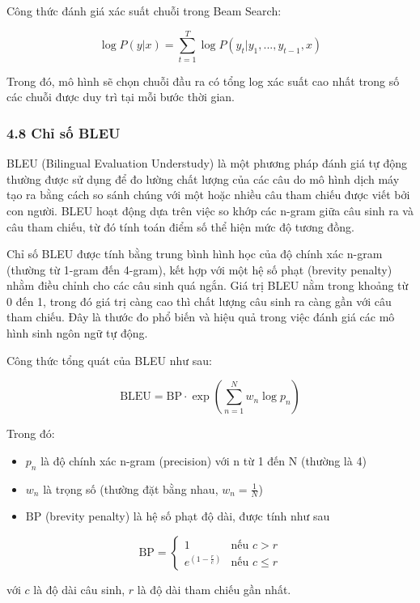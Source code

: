 \documentclass[../main.tex]{subfiles}
\begin{document}
Công thức đánh giá xác suất chuỗi trong Beam Search:

$$
\log P(y | x) = \sum_{t=1}^{T} \log P(y_t | y_1, ..., y_{t-1}, x)
$$

Trong đó, mô hình sẽ chọn chuỗi đầu ra có tổng log xác suất cao nhất trong số các chuỗi được duy trì tại mỗi bước thời gian.

\subsubsection*{4.8 Chỉ số BLEU}


BLEU (Bilingual Evaluation Understudy) là một phương pháp đánh giá tự động thường được sử dụng để đo lường chất lượng của các câu do mô hình dịch máy tạo ra bằng cách so sánh chúng với một hoặc nhiều câu tham chiếu được viết bởi con người. BLEU hoạt động dựa trên việc so khớp các n-gram giữa câu sinh ra và câu tham chiếu, từ đó tính toán điểm số thể hiện mức độ tương đồng.

Chỉ số BLEU được tính bằng trung bình hình học của độ chính xác n-gram (thường từ 1-gram đến 4-gram), kết hợp với một hệ số phạt (brevity penalty) nhằm điều chỉnh cho các câu sinh quá ngắn. Giá trị BLEU nằm trong khoảng từ 0 đến 1, trong đó giá trị càng cao thì chất lượng câu sinh ra càng gần với câu tham chiếu. Đây là thước đo phổ biến và hiệu quả trong việc đánh giá các mô hình sinh ngôn ngữ tự động.

Công thức tổng quát của BLEU như sau:

$$
\text{BLEU} = \text{BP} \cdot \exp\left( \sum_{n=1}^{N} w_n \log p_n \right)
$$

Trong đó:

\begin{itemize}
    \item $p_n$ là độ chính xác n-gram (precision) với n từ 1 đến N (thường là 4)
    \item $w_n$ là trọng số (thường đặt bằng nhau, $w_n = \frac{1}{N}$)
    \item $\text{BP}$ (brevity penalty) là hệ số phạt độ dài, được tính như sau
\end{itemize}

  $$
  \text{BP} = \begin{cases}
  1 & \text{nếu } c > r \\
  e^{(1 - \frac{r}{c})} & \text{nếu } c \leq r
  \end{cases}
  $$

  với $c$ là độ dài câu sinh, $r$ là độ dài tham chiếu gần nhất.
\end{document}
